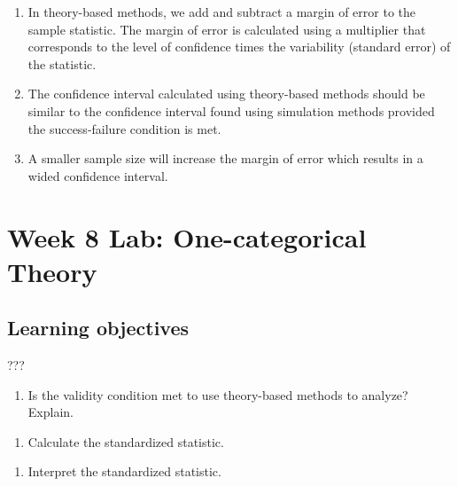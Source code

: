 \documentclass[
]{report}
\providecommand{\tightlist}{%
  \setlength{\itemsep}{0pt}\setlength{\parskip}{0pt}}
\begin{document}
\begin{enumerate}
\def\labelenumi{\arabic{enumi}.}
\item
  In theory-based methods, we add and subtract a margin of error to the sample statistic. The margin of error is calculated using a multiplier that corresponds to the level of confidence times the variability (standard error) of the statistic.
\item
  The confidence interval calculated using theory-based methods should be similar to the confidence interval found using simulation methods provided the success-failure condition is met.
\item
  A smaller sample size will increase the margin of error which results in a wided confidence interval.
\end{enumerate}

\newpage

\hypertarget{week-8-lab-one-categorical-theory}{%
\section{Week 8 Lab: One-categorical Theory}\label{week-8-lab-one-categorical-theory}}


\hypertarget{learning-objectives-11}{%
\subsection{Learning objectives}\label{learning-objectives-11}}

???

\begin{enumerate}
\def\labelenumi{\arabic{enumi}.}
\setcounter{enumi}{8}
\tightlist
\item
  Is the validity condition met to use theory-based methods to analyze? Explain.
\end{enumerate}

\vspace{0.8in}

\begin{enumerate}
\def\labelenumi{\arabic{enumi}.}
\setcounter{enumi}{9}
\tightlist
\item
  Calculate the standardized statistic.
\end{enumerate}

\vspace{0.8in}

\begin{enumerate}
\def\labelenumi{\arabic{enumi}.}
\setcounter{enumi}{10}
\tightlist
\item
  Interpret the standardized statistic.
\end{enumerate}
\end{document}
